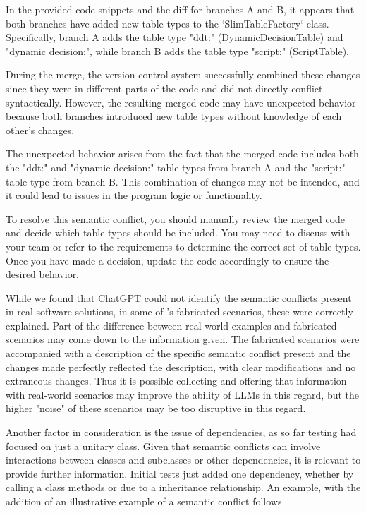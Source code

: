 \begin{response}
In the provided code snippets and the diff for branches A and B, it appears that both branches have added new table types to the `SlimTableFactory` class. Specifically, branch A adds the table type "ddt:" (DynamicDecisionTable) and "dynamic decision:", while branch B adds the table type "script:" (ScriptTable).

During the merge, the version control system successfully combined these changes since they were in different parts of the code and did not directly conflict syntactically. However, the resulting merged code may have unexpected behavior because both branches introduced new table types without knowledge of each other's changes.

The unexpected behavior arises from the fact that the merged code includes both the "ddt:" and "dynamic decision:" table types from branch A and the "script:" table type from branch B. This combination of changes may not be intended, and it could lead to issues in the program logic or functionality.

To resolve this semantic conflict, you should manually review the merged code and decide which table types should be included. You may need to discuss with your team or refer to the requirements to determine the correct set of table types. Once you have made a decision, update the code accordingly to ensure the desired behavior.
\end{response}

While we found that ChatGPT could not identify the semantic conflicts present in real software solutions, in some of \citet{kn:nuno}'s fabricated scenarios, these were correctly explained. Part of the difference between real-world examples and fabricated scenarios may come down to the information given. The fabricated scenarios were accompanied with a description of the specific semantic conflict present and the changes made perfectly reflected the description, with clear modifications and no extraneous changes. Thus it is possible collecting and offering that information with real-world scenarios may improve the ability of LLMs in this regard, but the higher "noise" of these scenarios may be too disruptive in this regard.

Another factor in consideration is the issue of dependencies, as so far testing had focused on just a unitary class. Given that semantic conflicts can involve interactions between classes and subclasses or other dependencies, it is relevant to provide further information. Initial tests just added one dependency, whether by calling a class methods or due to a inheritance relationship. An example, with the addition of an illustrative example of a semantic conflict follows.

